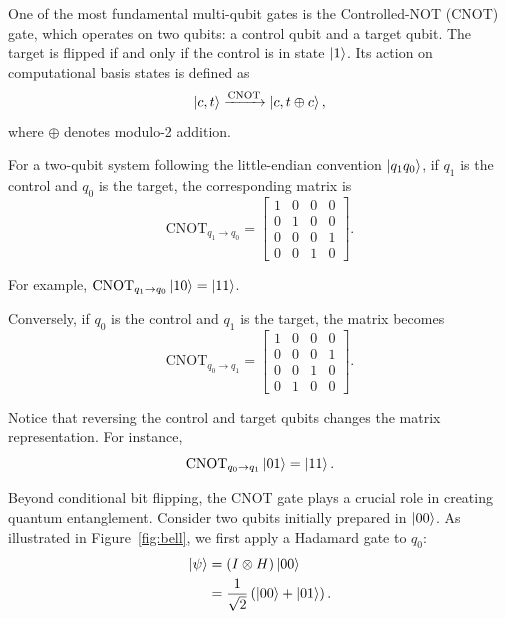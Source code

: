 \documentclass[12pt]{article}
\numberwithin{equation}{section}  %
\begin{document}
One of the most fundamental multi-qubit gates is the Controlled-NOT (CNOT) gate, which operates on two qubits: a control qubit and a target qubit. The target is flipped if and only if the control is in state $\ket{1}$. Its action on computational basis states is defined as
\begin{equation}
    \ket{c,t}
    \xrightarrow{\mathrm{CNOT}}
    \ket{c,t\oplus c},
    \label{eq:cnot_operation}
\end{equation}
where $\oplus$ denotes modulo-2 addition.

For a two-qubit system following the little-endian convention $\ket{q_1q_0}$, if $q_1$ is the control and $q_0$ is the target, the corresponding matrix is
\begin{equation}
    \mathrm{CNOT}_{q_1\rightarrow q_0}
    =
    \begin{bmatrix}
        1&0&0&0\\
        0&1&0&0\\
        0&0&0&1\\
        0&0&1&0
    \end{bmatrix}.
    \label{eq:cnot_10}
\end{equation}

For example, $\mathrm{CNOT}_{q_1\rightarrow q_0} \ket{10}=\ket{11}$.

Conversely, if $q_0$ is the control and $q_1$ is the target, the matrix becomes
\begin{equation}
    \mathrm{CNOT}_{q_0\rightarrow q_1}
    =
    \begin{bmatrix}
        1&0&0&0\\
        0&0&0&1\\
        0&0&1&0\\
        0&1&0&0
    \end{bmatrix}.
    \label{eq:cnot_01}
\end{equation}

Notice that reversing the control and target qubits changes the matrix representation. For instance,
\begin{equation}
    \mathrm{CNOT}_{q_0\rightarrow q_1}
    \ket{01}=\ket{11}.
\end{equation}

Beyond conditional bit flipping, the CNOT gate plays a crucial role in creating quantum entanglement. Consider two qubits initially prepared in $\ket{00}$. As illustrated in Figure~\ref{fig:bell}, we first apply a Hadamard gate to $q_0$:
\begin{equation}
\begin{aligned}
    \ket{\psi}
    &=(I\otimes H)\ket{00}\\
    &=\frac{1}{\sqrt{2}}
    \left(\ket{00}+\ket{01}\right).
\end{aligned}
\end{equation}
\end{document}
